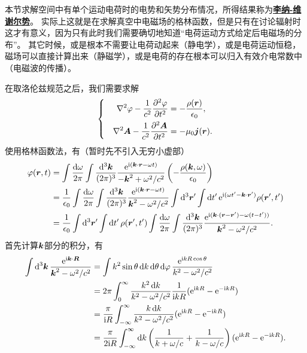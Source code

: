 \documentclass[UTF8, a4paper]{ctexart}
\newcommand*{\ee}{\mathrm{e}}
\newcommand*{\ii}{\mathrm{i}}
\newcommand*{\concept}[1]{\underline{\textbf{#1}}}
\newenvironment{bigcase}{\left\{\quad\begin{aligned}}{\end{aligned}\right.}
\begin{document}
本节求解空间中有单个运动电荷时的电势和矢势分布情况，所得结果称为\concept{李纳-维谢尔势}。
实际上这就是在求解真空中电磁场的格林函数，但是只有在讨论辐射时这才有意义，因为只有此时我们需要确切地知道“电荷运动方式给定后电磁场的分布”。
其它时候，或是根本不需要让电荷动起来（静电学），或是电荷运动恒稳，磁场可以直接计算出来（静磁学），或是电荷的存在根本可以归入有效介电常数中（电磁波的传播）。

在取洛伦兹规范之后，我们需要求解
\begin{equation}
    \begin{bigcase}
        \laplacian{\varphi} - \frac{1}{c^2} \pdv[2]{\varphi}{t} &= - \frac{\rho(\vb*{r})}{\epsilon_0}, \\
        \laplacian{\vb*{A}} - \frac{1}{c^2} \pdv[2]{\vb*{A}}{t} &= - \mu_0 \vb*{j}(\vb*{r}).
    \end{bigcase}
\end{equation}
使用格林函数法，有（暂时先不引入无穷小虚部）
\[
    \begin{aligned}
        \varphi(\vb*{r}, t) &= \int \frac{\dd{\omega}}{2\pi} \int \frac{\dd[3]{\vb*{k}}}{(2\pi)^3} \frac{\ee^{\ii (\vb*{k} \cdot \vb*{r} - \omega t)}}{- \vb*{k}^2 + \omega^2/c^2} \left( - \frac{\rho(\vb*{k}, \omega)}{\epsilon_0} \right) \\
        &= \frac{1}{\epsilon_0} \int \frac{\dd{\omega}}{2\pi} \int \frac{\dd[3]{\vb*{k}}}{(2\pi)^3} \frac{\ee^{\ii (\vb*{k} \cdot \vb*{r} - \omega t)}}{\vb*{k}^2 - \omega^2/c^2} \int \dd[3]{\vb*{r}'} \int \dd{t'} \ee^{\ii (\omega t' - \vb*{k} \cdot \vb*{r}')} \rho(\vb*{r}', t') \\
        &= \frac{1}{\epsilon_0} \int \dd[3]{\vb*{r}'} \int \dd{t'} \rho(\vb*{r}', t') \int \frac{\dd{\omega}}{2\pi} \int \frac{\dd[3]{\vb*{k}}}{(2\pi)^3} \frac{\ee^{\ii (\vb*{k} \cdot (\vb*{r} - \vb*{r}') - \omega (t - t'))}}{\vb*{k}^2 - \omega^2/c^2}.
    \end{aligned}
\]
首先计算$\vb*{k}$部分的积分，有
\[
    \begin{aligned}
        \int \dd[3]{\vb*{k}} \frac{\ee^{\ii \vb*{k} \cdot \vb*{R}}}{\vb*{k}^2 - \omega^2/c^2} &= \int k^2 \sin \theta \dd{k} \dd{\theta} \dd{\varphi} \frac{\ee^{\ii k R \cos \theta}}{k^2 - \omega^2 / c^2} \\
        &= 2\pi \int_0^\infty \frac{k^2 \dd{k}}{k^2 - \omega^2 / c^2} \frac{1}{\ii k R} (\ee^{\ii k R} - \ee^{-\ii k R}) \\
        &= \frac{\pi}{\ii R} \int_{-\infty}^\infty \frac{k \dd{k}}{k^2 - \omega^2 / c^2} (\ee^{\ii k R} - \ee^{-\ii k R}) \\
        &= \frac{\pi}{2 \ii R} \int_{-\infty}^\infty \dd{k} \left( \frac{1}{k + \omega / c} + \frac{1}{k - \omega / c} \right) (\ee^{\ii k R} - \ee^{-\ii k R}).
    \end{aligned}
\]
\end{document}
